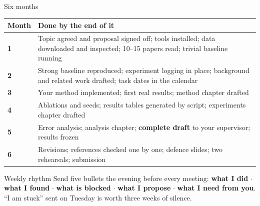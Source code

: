 \documentclass[aspectratio=169,11pt]{beamer}
\begin{document}
\begin{frame}{Six months}
\footnotesize
\begin{tabularx}{\textwidth}{>{\raggedright\arraybackslash}p{1.6cm} X}
\toprule
\textbf{\color{brand}Month} & \textbf{\color{brand}Done by the end of it} \\
\midrule
\rowcolor{rowtint} \textbf{1} & Topic agreed and proposal signed off; tools installed; data downloaded and inspected; 10--15 papers read; trivial baseline running \\
\textbf{2} & Strong baseline reproduced; experiment logging in place; background and related work drafted; task dates in the calendar \\
\rowcolor{rowtint} \textbf{3} & Your method implemented; first real results; method chapter drafted \\
\textbf{4} & Ablations and seeds; results tables generated by script; experiments chapter drafted \\
\rowcolor{rowtint} \textbf{5} & Error analysis; analysis chapter; \textbf{complete draft} to your supervisor; results frozen \\
\textbf{6} & Revisions; references checked one by one; defence slides; two rehearsals; submission \\
\bottomrule
\end{tabularx}
\vspace{2mm}
\begin{block}{Weekly rhythm}
\footnotesize
Send five bullets the evening before every meeting: \textbf{what I did}
$\cdot$ \textbf{what I found} $\cdot$ \textbf{what is blocked} $\cdot$
\textbf{what I propose} $\cdot$ \textbf{what I need from you}. ``I am stuck''
sent on Tuesday is worth three weeks of silence.
\end{block}
\end{frame}
\end{document}
